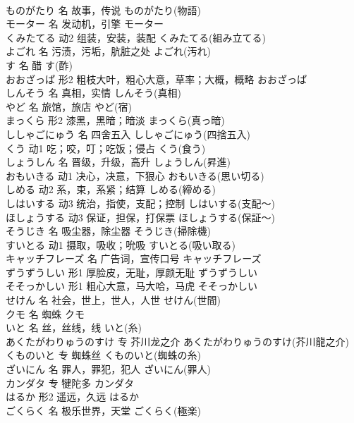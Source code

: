 \documentclass[8pt]{extreport}
\begin{document}
\begin{CJK}{UTF8}{min}
\\	ものがたり	名	故事，传说	ものがたり(物語)	
\\	モーター	名	发动机，引擎	モーター	
\\	くみたてる	动2	组装，安装，装配	くみたてる(組み立てる)	
\\	よごれ	名	污渍，污垢，肮脏之处	よごれ(汚れ)	
\\	す	名	醋	す(酢)	
\\	おおざっぱ	形2	粗枝大叶，粗心大意，草率；大概，概略	おおざっぱ	
\\	しんそう	名	真相，实情	しんそう(真相)	
\\	やど	名	旅馆，旅店	やど(宿)	
\\	まっくら	形2	漆黑，黑暗；暗淡	まっくら(真っ暗)	
\\	ししゃごにゅう	名	四舍五入	ししゃごにゅう(四捨五入)	
\\	くう	动1	吃；咬，叮；吃饭；侵占	くう(食う)	
\\	しょうしん	名	晋级，升级，高升	しょうしん(昇進)	
\\	おもいきる	动1	决心，决意，下狠心	おもいきる(思い切る)	
\\	しめる	动2	系，束，系紧；结算	しめる(締める)	
\\	しはいする	动3	统治，指使，支配；控制	しはいする(支配～)	
\\	ほしょうする	动3	保证，担保，打保票	ほしょうする(保証～)	
\\	そうじき	名	吸尘器，除尘器	そうじき(掃除機)	
\\	すいとる	动1	摄取，吸收；吮吸	すいとる(吸い取る)	
\\	キャッチフレーズ	名	广告词，宣传口号	キャッチフレーズ	
\\	ずうずうしい	形1	厚脸皮，无耻，厚颜无耻	ずうずうしい	
\\	そそっかしい	形1	粗心大意，马大哈，马虎	そそっかしい	
\\	せけん	名	社会，世上，世人，人世	せけん(世間)	
\\	クモ	名	蜘蛛	クモ	
\\	いと	名	丝，丝线，线	いと(糸)	
\\	あくたがわりゅうのすけ	专	芥川龙之介	あくたがわりゅうのすけ(芥川龍之介)	
\\	くものいと	专	蜘蛛丝	くものいと(蜘蛛の糸)	
\\	ざいにん	名	罪人，罪犯，犯人	ざいにん(罪人)	
\\	カンダタ	专	犍陀多	カンダタ	
\\	はるか	形2	遥远，久远	はるか	
\\	ごくらく	名	极乐世界，天堂	ごくらく(極楽)	

\end{CJK}
\end{document}
